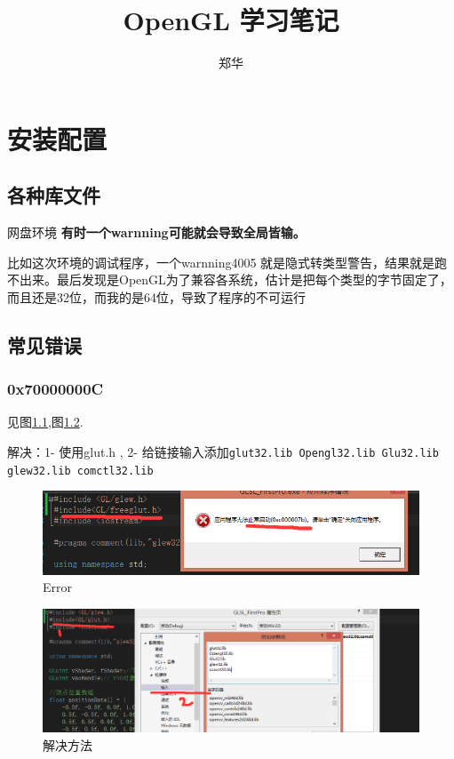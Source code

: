 \documentclass[UTF8,a4paper,12pt]{ctexbook}
\author{\kaishu 郑华}
\title{\heiti OpenGL 学习笔记}
\begin{document}
 	\maketitle
 
	\newpage
	\tableofcontents
	
\newpage
\chapter{安装配置}
    \section{各种库文件}网盘环境
    \textbf{有时一个warnning可能就会导致全局皆输。}
    
    比如这次环境的调试程序，一个warnning4005  就是隐式转类型警告，结果就是跑不出来。最后发现是OpenGL为了兼容各系统，估计是把每个类型的字节固定了，而且还是32位，而我的是64位，导致了程序的不可运行
    
    \section{常见错误}
	    \subsection{0x70000000C}见图\ref{Glut Error},图\ref{Glut_fix}.
	    
		    解决：1- 使用glut.h , 2- 给链接输入添加\verb|glut32.lib Opengl32.lib Glu32.lib glew32.lib comctl32.lib|
		    \begin{figure}[h]
		    	\begin{center}
					\includegraphics[scale = 0.5]{glutDoesNotMatchError.png}%
		    		\caption{Error}
		    		\label{Glut Error}
		    	\end{center}
		    \end{figure}
		    \begin{figure}[h]
		    	\centering
		    	\includegraphics[scale = 0.4]{glutMatch.png}
		    	\caption{解决方法}
		    	\label{Glut_fix}
		    \end{figure}
\end{document}
